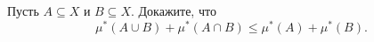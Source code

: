 \begin{task}{3}
Пусть $A \subseteq X$ и $B \subseteq X$. Докажите, что
$$ \mu^*(A \cup B) + \mu^* (A \cap B) \leqslant \mu^*(A) + \mu^*(B).$$
\end{task}

\begin{solution}

\end{solution}